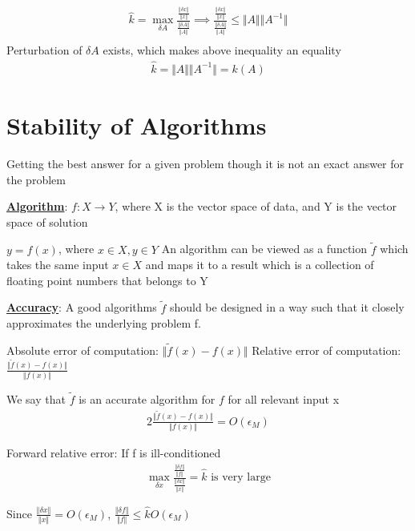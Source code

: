 \documentclass{article}
\begin{document}
\begin{align*}
  \hat{k} = \max_{\delta A}\frac{\frac{\Vert \delta x \Vert}{\Vert x \Vert}}{\frac{\Vert \delta A \Vert}{\Vert A \Vert}}
  \implies \frac{\frac{\Vert \delta x \Vert}{\Vert x \Vert}}{\frac{\Vert \delta A \Vert}{\Vert A \Vert}} \leq \Vert A \Vert \Vert A^{-1} \Vert\\
\end{align*}
Perturbation of $\delta A$ exists, which makes above inequality an equality
\begin{align*}
  \hat{k} = \Vert A \Vert \Vert A^{-1} \Vert = k(A)
\end{align*}

\section{Stability of Algorithms}
\label{sec:stability-algorithms}

Getting the best answer for a given problem though it is not an exact answer for the problem

\underline{\textbf{Algorithm}}:
$f: X \rightarrow Y$,
where X is the vector space of data, 
and Y is the vector space of solution

$y = f(x)$, where $x \in X, y \in Y$
An algorithm can be viewed as a function $\tilde{f}$ which takes the same input $x \in X$
and maps it to a result which is a collection of floating point numbers that belongs to Y

\underline{\textbf{Accuracy}}: A good algorithms $\tilde{f}$ should be designed in a way
such that it closely approximates the underlying problem f.

Absolute error of computation: $\Vert \tilde{f}(x) - f(x) \Vert$
Relative error of computation: $\frac{\Vert \tilde{f}(x) - f(x) \Vert}{\Vert f(x) \Vert}$

We say that $\tilde{f}$ is an accurate algorithm for $f$ for all relevant input x
\begin{align*}
  2\frac{\Vert \tilde{f}(x) - f(x) \Vert}{\Vert f(x) \Vert} = O(\epsilon_{M})
\end{align*}

Forward relative error:
If f is ill-conditioned
\begin{align*}
  \max_{\delta x} \frac{
  \frac{\Vert \delta f \Vert}{\Vert f \Vert}
  }{
  \frac{\Vert \delta x \Vert}{\Vert x \Vert}
  }
  = \hat{k} \text{ is very large}
\end{align*}

Since $\frac{\Vert \delta x \Vert}{\Vert x \Vert} = O(\epsilon_M)$, $\frac{\Vert \delta f \Vert}{\Vert f \Vert} \leq \hat{k}O(\epsilon_M)$
\end{document}
